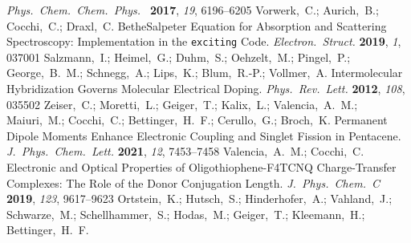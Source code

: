 \documentclass[journal=jpclcd,manuscript=letter]{achemso}
\begin{document}
\begin{mcitethebibliography}{51}
  \emph{Phys.~Chem.~Chem.~Phys.~} \textbf{2017}, \emph{19}, 6196--6205\relax
\mciteBstWouldAddEndPuncttrue
\mciteSetBstMidEndSepPunct{\mcitedefaultmidpunct}
{\mcitedefaultendpunct}{\mcitedefaultseppunct}\relax
\EndOfBibitem
{}
Vorwerk,~C.; Aurich,~B.; Cocchi,~C.; Draxl,~C. Bethe{\textendash}Salpeter
  Equation for Absorption and Scattering Spectroscopy: Implementation in the
  \texttt{exciting} Code. \emph{Electron.~Struct.} \textbf{2019}, \emph{1},
  037001\relax
\mciteBstWouldAddEndPuncttrue
\mciteSetBstMidEndSepPunct{\mcitedefaultmidpunct}
{\mcitedefaultendpunct}{\mcitedefaultseppunct}\relax
\EndOfBibitem
{}
Salzmann,~I.; Heimel,~G.; Duhm,~S.; Oehzelt,~M.; Pingel,~P.; George,~B.~M.;
  Schnegg,~A.; Lips,~K.; Blum,~R.-P.; Vollmer,~A. 
  Intermolecular Hybridization Governs Molecular Electrical Doping.
  \emph{Phys.~Rev.~Lett.} \textbf{2012}, \emph{108}, 035502\relax
\mciteBstWouldAddEndPuncttrue
\mciteSetBstMidEndSepPunct{\mcitedefaultmidpunct}
{\mcitedefaultendpunct}{\mcitedefaultseppunct}\relax
\EndOfBibitem
{}
Zeiser,~C.; Moretti,~L.; Geiger,~T.; Kalix,~L.; Valencia,~A.~M.; Maiuri,~M.;
  Cocchi,~C.; Bettinger,~H.~F.; Cerullo,~G.; Broch,~K. Permanent Dipole Moments
  Enhance Electronic Coupling and Singlet Fission in Pentacene.
  \emph{J.~Phys.~Chem.~Lett.} \textbf{2021}, \emph{12}, 7453--7458\relax
\mciteBstWouldAddEndPuncttrue
\mciteSetBstMidEndSepPunct{\mcitedefaultmidpunct}
{\mcitedefaultendpunct}{\mcitedefaultseppunct}\relax
\EndOfBibitem
{}
Valencia,~A.~M.; Cocchi,~C. Electronic and Optical Properties of
  Oligothiophene-F4TCNQ Charge-Transfer Complexes: The Role of the Donor
  Conjugation Length. \emph{J.~Phys.~Chem.~C} \textbf{2019}, \emph{123},
  9617--9623\relax
\mciteBstWouldAddEndPuncttrue
\mciteSetBstMidEndSepPunct{\mcitedefaultmidpunct}
{\mcitedefaultendpunct}{\mcitedefaultseppunct}\relax
\EndOfBibitem
{}
Ortstein,~K.; Hutsch,~S.; Hinderhofer,~A.; Vahland,~J.; Schwarze,~M.;
  Schellhammer,~S.; Hodas,~M.; Geiger,~T.; Kleemann,~H.; Bettinger,~H.~F.

\end{mcitethebibliography}
\end{document}
